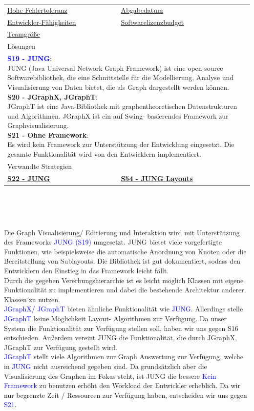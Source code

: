 \documentclass[enabledeprecatedfontcommands,fontsize=11pt,paper=a4,twoside]{scrartcl}
\newcounter{one}
\newcounter{two}[one]
\newcommand{\cb}[1]{{\textcolor{blue}{#1}}}
\begin{document}
\begin{tabular} {|p{8cm} p{8cm}|}
	\hyperlink {tt}{Hohe Fehlertoleranz} &
	\hyperlink {uu}{Abgabedatum} \\
	\hyperlink {vv}{Entwickler-Fähigkeiten} &
	\hyperlink {ww}{Softwarelizenzbudget} \\
	\hyperlink {xx}{Teamgröße} &
	\\ \hline
	\multicolumn{2}{|l|}{Lösungen} \\
	\multicolumn{2}{|l|}{\parbox{16cm}{
			\textbf{\cb{\hypertarget{eee}{S19 - JUNG}}}: \\
			JUNG (Java Universal Network Graph Framework) ist eine open-source Softwarebibliothek, die eine Schnittstelle für die Modellierung, Analyse und Visualisierung von Daten bietet, die als Graph dargestellt werden können. \\
			\textbf{S20 - JGraphX, JGraphT}: \\
			JGraphT ist eine Java-Bibliothek mit graphentheoretischen Datenstrukturen und Algorithmen. JGraphX ist ein auf Swing- basierendes Framework zur Graphvisualisierung. \\
			\textbf{S21 - Ohne Framework}: \\
			Es wird kein Framework zur Unterstützung der Entwicklung eingesetzt. Die gesamte Funktionalität wird von den Entwicklern implementiert.
	} }\\ [11ex] \hline
	\multicolumn{2}{|l|}{Verwandte Strategien} \\
	\textbf{\hyperlink{fff}{S22 - JUNG}}&
	\textbf{\hyperlink{xee}{S54 - JUNG Layouts}}
	\\\hline
\end{tabular}\\ \\ \\
\begin{onehalfspace}
	Die Graph Visualisierung/ Editierung und Interaktion wird mit Unterstützung des Frameworks \cb{JUNG (S19)} umgesetzt. JUNG bietet viele vorgefertigte Funktionen, wie beispielsweise die automatische Anordnung von Knoten oder die Bereitstellung von Sublayouts. Die Bibliothek ist gut dokumentiert, sodass den Entwicklern den Einstieg in das Framework leicht fällt. \\
	Durch die gegeben Vererbungshierarchie ist es leicht möglich Klassen mit eigene Funktionalität zu implementieren und dabei die bestehende Architektur anderer Klassen zu nutzen. \\
	\cb{JGraphX/ JGraphT} bieten ähnliche Funktionalität wie \cb{JUNG}. Allerdings stelle \cb{JGraphT} keine Möglichkeit Layout- Algorithmen zur Verfügung. Da unser System die Funktionalität zur Verfügung stellen soll, haben wir uns gegen S16 entschieden. Außerdem vereint JUNG die Funktionalität, die durch JGraphX, JGraphT zur Verfügung gestellt wird.\\
	\cb{JGraphT} stellt viele Algorithmen zur Graph Auswertung zur Verfügung, welche in \cb{JUNG} nicht ausreichend gegeben sind. Da grundsätzlich aber die Visualisierung des Graphen im Fokus steht, ist JUNG die bessere 
	\cb{Kein Framework} zu benutzen erhöht den Workload der Entwickler erheblich. Da wir nur begrenzte Zeit / Ressourcen zur Verfügung haben, entscheiden wir uns gegen \cb{S21}.
\end{onehalfspace}
\end{document}
